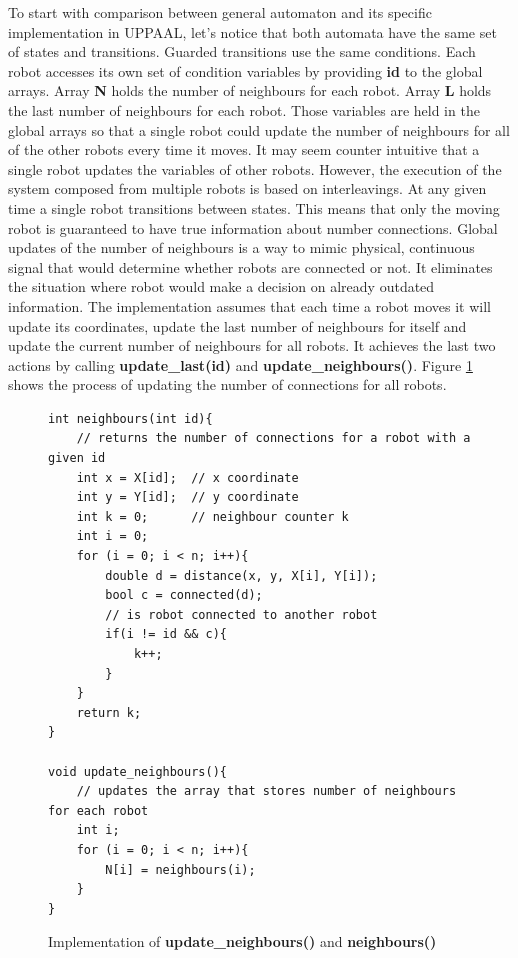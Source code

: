 To start with comparison between general automaton and its specific implementation in UPPAAL, let's notice that both automata have the same set of states and transitions. Guarded transitions use the same conditions. Each robot accesses its own set of condition variables by providing \textbf{id} to the global arrays. Array \textbf{N} holds the number of neighbours for each robot. Array \textbf{L} holds the last number of neighbours for each robot. Those variables are held in the global arrays so that a single robot could update the number of neighbours for all of the other robots every time it moves. It may seem counter intuitive that a single robot updates the variables of other robots. However, the execution of the system composed from multiple robots is based on interleavings. At any given time a single robot transitions between states. This means that only the moving robot is guaranteed to have true information about number connections. Global updates of the number of neighbours is a way to mimic physical, continuous signal that would determine whether robots are connected or not. It eliminates the situation where robot would make a decision on already outdated information. The implementation assumes that each time a robot moves it will update its coordinates, update the last number of neighbours for itself and update the current number of neighbours for all robots. It achieves the last two actions by calling \textbf{update\_last(id)} and \textbf{update\_neighbours()}. Figure \ref{fig:neighbours} shows the process of updating the number of connections for all robots.
\begin{figure}[H]
\caption{Implementation of \textbf{update\_neighbours()} and \textbf{neighbours()}}
\lstset { language=C++ }
\begin{lstlisting}
int neighbours(int id){
    // returns the number of connections for a robot with a given id
    int x = X[id];  // x coordinate
    int y = Y[id];  // y coordinate
    int k = 0;      // neighbour counter k
    int i = 0;   
    for (i = 0; i < n; i++){
        double d = distance(x, y, X[i], Y[i]);
        bool c = connected(d);
        // is robot connected to another robot
        if(i != id && c){
            k++;
        }
    }
    return k;
}

void update_neighbours(){
    // updates the array that stores number of neighbours for each robot
    int i;
    for (i = 0; i < n; i++){
        N[i] = neighbours(i);
    }
}
\end{lstlisting}
\label{fig:neighbours}
\end{figure}

